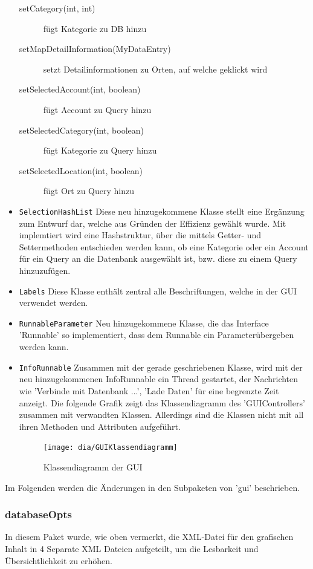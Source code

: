 \begin{itemize}
\begin{description}
		\item[setCategory(int, int)] fügt Kategorie zu DB hinzu
		\item[setMapDetailInformation(MyDataEntry)] setzt Detailinformationen zu Orten, auf welche geklickt wird
		\item[setSelectedAccount(int, boolean)] fügt Account zu Query hinzu
		\item[setSelectedCategory(int, boolean)] fügt Kategorie zu Query hinzu
		\item[setSelectedLocation(int, boolean)] fügt Ort zu Query hinzu
	\end{description}
	\item \lstinline{SelectionHashList}
	\quad
	Diese neu hinzugekommene Klasse stellt  eine Ergänzung zum Entwurf dar, welche aus Gründen der Effizienz gewählt wurde. Mit implemtiert wird eine Hashstruktur, über die mittels Getter- und Settermethoden entschieden werden kann, ob eine Kategorie oder ein Account für ein Query an die Datenbank ausgewählt ist, bzw. diese zu einem Query hinzuzufügen.
	\item \lstinline{Labels}
	\quad
	Diese Klasse enthält zentral alle Beschriftungen, welche in der GUI verwendet werden.
	\item \lstinline{RunnableParameter}
	\quad 
	Neu hinzugekommene Klasse, die das Interface 'Runnable' so implementiert, dass dem Runnable ein Parameterübergeben werden kann.
	\item \lstinline{InfoRunnable}
	\quad
	Zusammen mit der gerade geschriebenen Klasse, wird mit der neu hinzugekommenen InfoRunnable ein Thread gestartet, der Nachrichten wie 'Verbinde mit Datenbank ...', 'Lade Daten' für eine begrenzte Zeit anzeigt.	
	Die folgende Grafik zeigt das Klassendiagramm des 'GUIControllers' zusammen mit verwandten Klassen. Allerdings sind die Klassen nicht mit all ihren Methoden und Attributen aufgeführt.
	\begin{figure}[H]
		\centering
		\texttt{[image: dia/GUIKlassendiagramm]}
		\caption{Klassendiagramm der GUI}
		\label{fig:GUI}
	\end{figure}
\end{itemize}

Im Folgenden werden die Änderungen in den Subpaketen von 'gui' beschrieben.

\subsubsection{databaseOpts}
In diesem Paket wurde, wie oben vermerkt, die XML-Datei für den grafischen Inhalt in 4 Separate XML Dateien aufgeteilt, um die Lesbarkeit und Übersichtlichkeit zu erhöhen.


